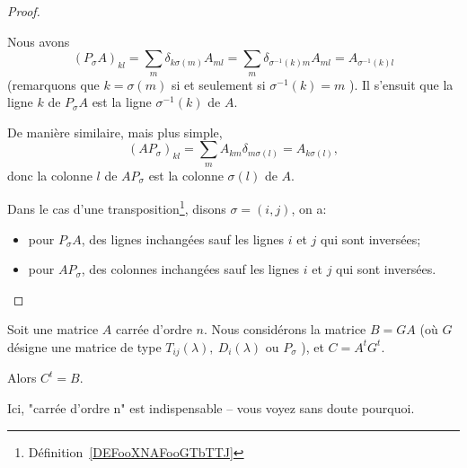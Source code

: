 \begin{proof}
\begin{subproof}
  \item[Pour les permutations] Nous avons
    \begin{equation}
        (P_{\sigma}A)_{kl}=\sum_m\delta_{k\sigma(m)}A_{ml}=\sum_m\delta_{\sigma^{-1}(k)m}A_{ml}=A_{\sigma^{-1}(k)l}
    \end{equation}
    (remarquons que \(k = \sigma(m) \) si et seulement si \(\sigma^{-1}(k)  = m\) ). Il s'ensuit que la ligne \( k \) de \(P_{\sigma}A \) est la ligne  \(\sigma^{-1}(k) \) de \(A \).
    
    De manière similaire, mais plus simple,
    \begin{equation}
        (AP_{\sigma})_{kl}=  \sum_m A_{km} \delta_{m\sigma(l)} = A_{k\sigma(l)},
    \end{equation}
    donc la colonne \( l \) de \(AP_{\sigma}\) est la colonne \( \sigma(l) \) de \( A \).
    
    Dans le cas d'une transposition\footnote{Définition~\ref{DEFooXNAFooGTbTTJ}}, disons \( \sigma = (i,j) \), on a:
    \begin{itemize}
    \item
      pour \( P_{\sigma}A \), des lignes inchangées sauf les lignes \( i \) et \(j \) qui sont inversées;
    \item
      pour \( AP_{\sigma} \), des colonnes inchangées sauf les lignes \( i \) et \(j \) qui sont inversées.
    \end{itemize}
\end{subproof}      
\end{proof}


\begin{lemma}        \label{LEMooWMQWooGWFlmC}
    Soit une matrice \( A\) carrée d'ordre \( n \). Nous considérons la matrice \( B = GA \) (où \( G \) désigne une matrice de type \( T_{ij}(\lambda),\ D_{i}(\lambda)\) ou \( P_{\sigma} \) ), et \( C = A^t G^t \).
    
    Alors \( C^t=B\).
\end{lemma}
  Ici, "carrée d'ordre n" est indispensable -- vous voyez sans doute pourquoi.
  
